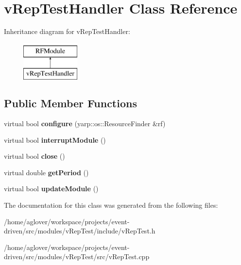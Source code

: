 \hypertarget{classvRepTestHandler}{}\section{v\+Rep\+Test\+Handler Class Reference}
\label{classvRepTestHandler}
Inheritance diagram for v\+Rep\+Test\+Handler\+:\begin{figure}[H]
\begin{center}
\leavevmode
\includegraphics[height=2.000000cm]{classvRepTestHandler}
\end{center}
\end{figure}
\subsection*{Public Member Functions}
\begin{DoxyCompactItemize}
\item 
virtual bool {\bfseries configure} (yarp\+::os\+::\+Resource\+Finder \&rf)\hypertarget{classvRepTestHandler_a75d6ab4e2998eccf96b0f90b53d183f3}{}\label{classvRepTestHandler_a75d6ab4e2998eccf96b0f90b53d183f3}

\item 
virtual bool {\bfseries interrupt\+Module} ()\hypertarget{classvRepTestHandler_aa67c736991dc0601e5775b8f60b680be}{}\label{classvRepTestHandler_aa67c736991dc0601e5775b8f60b680be}

\item 
virtual bool {\bfseries close} ()\hypertarget{classvRepTestHandler_ad40900db7b64a3b8539834ff18ddc2c1}{}\label{classvRepTestHandler_ad40900db7b64a3b8539834ff18ddc2c1}

\item 
virtual double {\bfseries get\+Period} ()\hypertarget{classvRepTestHandler_a53456bbfb2edf31921b6b775b3bc1119}{}\label{classvRepTestHandler_a53456bbfb2edf31921b6b775b3bc1119}

\item 
virtual bool {\bfseries update\+Module} ()\hypertarget{classvRepTestHandler_a307f808f4e474d8b7c352e346cbda80b}{}\label{classvRepTestHandler_a307f808f4e474d8b7c352e346cbda80b}

\end{DoxyCompactItemize}


The documentation for this class was generated from the following files\+:\begin{DoxyCompactItemize}
\item 
/home/aglover/workspace/projects/event-\/driven/src/modules/v\+Rep\+Test/include/v\+Rep\+Test.\+h\item 
/home/aglover/workspace/projects/event-\/driven/src/modules/v\+Rep\+Test/src/v\+Rep\+Test.\+cpp\end{DoxyCompactItemize}

